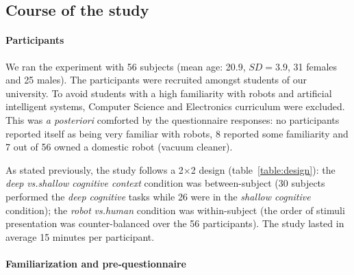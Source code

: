 \documentclass[lettersize, noapacite, twoside, HRI]{apa_HRI}
\newcommand{\vs}{\textit{vs.}\xspace}
\begin{document}
\subsection{Course of the study}

%
%
%
%
\paragraph{Participants}

We ran the experiment with 56 subjects (mean age: 20.9, $SD=3.9$, 31 females and
25 males).  The participants were recruited amongst students of our university.
To avoid students with a high familiarity with robots and artificial intelligent
systems, Computer Science and Electronics curriculum were excluded. This was
\textit{a posteriori} comforted by the questionnaire responses: no participants
reported itself as being very familiar with robots, 8 reported some familiarity
and 7 out of 56 owned a domestic robot (vacuum cleaner).

As stated previously, the study follows a 2$\times$2 design
(table~\ref{table:design}): the \emph{deep} \vs \emph{shallow cognitive context}
condition was between-subject (30 subjects performed the \emph{deep cognitive}
tasks while 26 were in the \emph{shallow cognitive} condition); the \emph{robot}
\vs \emph{human} condition was within-subject (the order of stimuli presentation
was counter-balanced over the 56 participants). The study lasted in average 15
minutes per participant.

\paragraph{Familiarization and pre-questionnaire}
\end{document}

